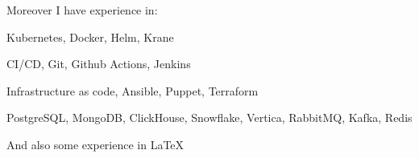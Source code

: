 Moreover I have experience in:
\begin{bulist}
\item Kubernetes, Docker, Helm, Krane
\item CI/CD, Git, Github Actions, Jenkins
\item Infrastructure as code, Ansible, Puppet, Terraform
\item PostgreSQL, MongoDB, ClickHouse, Snowflake, Vertica, RabbitMQ, Kafka,
  Redis
\end{bulist}
And also some experience in \LaTeX
